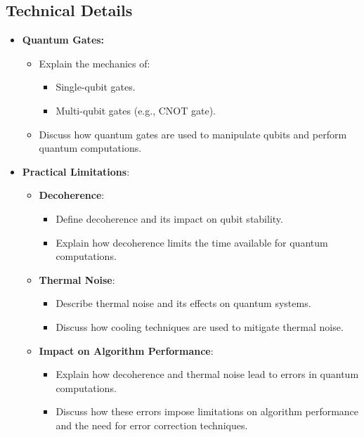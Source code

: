 \subsection{Technical Details}
\begin{itemize}
    \item \textbf{Quantum Gates:} 
        \begin{itemize}
            \item Explain the mechanics of:
                \begin{itemize}
                    \item Single-qubit gates. 
                    \item Multi-qubit gates (e.g., CNOT gate). 
                \end{itemize}
            \item Discuss how quantum gates are used to manipulate qubits and perform quantum computations.
        \end{itemize}
    \item \textbf{Practical Limitations}:
        \begin{itemize}
            \item \textbf{Decoherence}:
                \begin{itemize}
                    \item Define decoherence and its impact on qubit stability. 
                    \item Explain how decoherence limits the time available for quantum computations. 
                \end{itemize}
            \item \textbf{Thermal Noise}:
                \begin{itemize}
                    \item Describe thermal noise and its effects on quantum systems. 
                    \item Discuss how cooling techniques are used to mitigate thermal noise. 
                \end{itemize}
            \item \textbf{Impact on Algorithm Performance}:
                \begin{itemize}
                    \item Explain how decoherence and thermal noise lead to errors in quantum computations.
                    \item Discuss how these errors impose limitations on algorithm performance and the need for error correction techniques.
                \end{itemize}
        \end{itemize}
\end{itemize}

